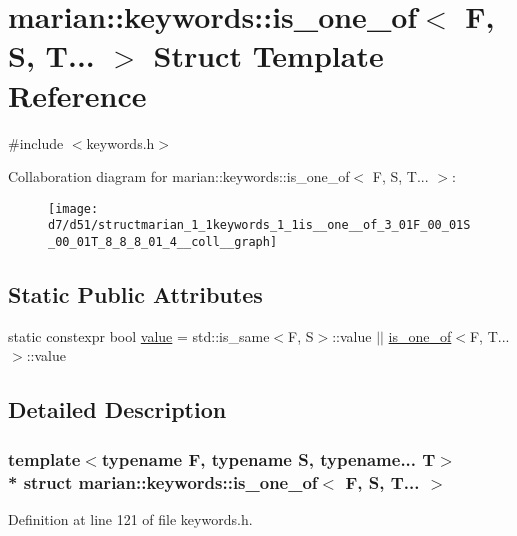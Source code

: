\hypertarget{structmarian_1_1keywords_1_1is__one__of_3_01F_00_01S_00_01T_8_8_8_01_4}{}\section{marian\+:\+:keywords\+:\+:is\+\_\+one\+\_\+of$<$ F, S, T... $>$ Struct Template Reference}
\label{structmarian_1_1keywords_1_1is__one__of_3_01F_00_01S_00_01T_8_8_8_01_4}


{\ttfamily \#include $<$keywords.\+h$>$}



Collaboration diagram for marian\+:\+:keywords\+:\+:is\+\_\+one\+\_\+of$<$ F, S, T... $>$\+:
\nopagebreak
\begin{figure}[H]
\begin{center}
\leavevmode
\texttt{[image: d7/d51/structmarian\_1\_1keywords\_1\_1is\_\_one\_\_of\_3\_01F\_00\_01S\_00\_01T\_8\_8\_8\_01\_4\_\_coll\_\_graph]}
\end{center}
\end{figure}
\subsection*{Static Public Attributes}
\begin{DoxyCompactItemize}
\item 
static constexpr bool \hyperlink{structmarian_1_1keywords_1_1is__one__of_3_01F_00_01S_00_01T_8_8_8_01_4_a3e314d3b6d9bd8be9b664bfd15478a93}{value} = std\+::is\+\_\+same$<$F, S$>$\+::value $\vert$$\vert$ \hyperlink{structmarian_1_1keywords_1_1is__one__of}{is\+\_\+one\+\_\+of}$<$F, T...$>$\+::value
\end{DoxyCompactItemize}


\subsection{Detailed Description}
\subsubsection*{template$<$typename F, typename S, typename... T$>$\\*
struct marian\+::keywords\+::is\+\_\+one\+\_\+of$<$ F, S, T... $>$}



Definition at line 121 of file keywords.\+h.



